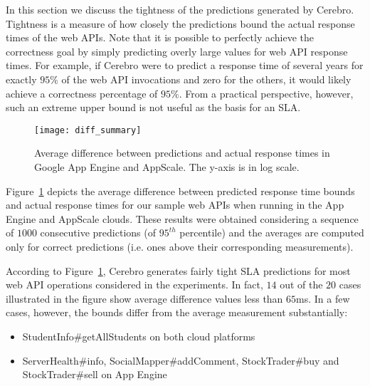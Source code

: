 In this section we discuss the tightness of the predictions generated by Cerebro. 
Tightness is a measure of how closely the predictions
bound the actual response times of the web APIs. 
Note that it is possible to perfectly achieve the correctness goal
by simply predicting overly large values for web API response times. For example, if Cerebro were to
predict a response time of several years for exactly $95\%$ of the web API
invocations and zero for the others, it would likely
achieve a correctness percentage of $95\%$.  From a practical perspective,
however, such an extreme upper bound is not useful as the basis for an SLA. 

\begin{figure}
\centering
\texttt{[image: diff\_summary]}
\caption{Average difference between predictions and actual response times in
Google App Engine and AppScale. The y-axis is in log scale.}
\label{fig:diff_summary}
\vspace{-0.2in}
\end{figure}

Figure~\ref{fig:diff_summary} depicts the average difference between predicted
response time bounds and actual response times for
our sample web APIs when running in the App Engine and AppScale clouds. 
These results were obtained considering a sequence of $1000$ 
consecutive predictions (of $95^{th}$ percentile) and the averages are
computed only for correct predictions (i.e. ones above their corresponding
measurements).

According to Figure~\ref{fig:diff_summary}, Cerebro generates fairly tight 
SLA predictions for most web API operations considered in the experiments. In fact,
$14$ out of the $20$ cases illustrated in the figure show average difference
values less than $65$ms. In a few cases, however, the bounds differ from the
average measurement substantially:
\begin{itemize}
\vspace{-0.05in}
\item StudentInfo\#getAllStudents on both cloud platforms
\vspace{-0.05in}
\item ServerHealth\#info, SocialMapper\#addComment, StockTrader\#buy and StockTrader\#sell on App Engine
\vspace{-0.05in}
\end{itemize}


